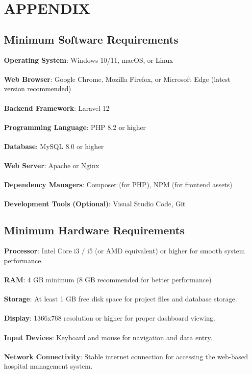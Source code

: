\chapter{APPENDIX}

\section{Minimum Software Requirements}

\medskip
\textbf{Operating System}: Windows 10/11, macOS, or Linux
\\\\
\textbf{Web Browser}: Google Chrome, Mozilla Firefox, or Microsoft Edge (latest version recommended)
\\\\
\textbf{Backend Framework}: Laravel 12
\\\\
\textbf{Programming Language}: PHP 8.2 or higher
\\\\
\textbf{Database}: MySQL 8.0 or higher
\\\\
\textbf{Web Server}: Apache or Nginx
\\\\
\textbf{Dependency Managers}: Composer (for PHP), NPM (for frontend assets)
\\\\
\textbf{Development Tools (Optional)}: Visual Studio Code, Git

\section{Minimum Hardware Requirements}

\textbf{Processor}: Intel Core i3 / i5 (or AMD equivalent) or higher for smooth system performance.
\\\\
\textbf{RAM}: 4 GB minimum (8 GB recommended for better performance)
\\\\
\textbf{Storage}: At least 1 GB free disk space for project files and database storage.
\\\\
\textbf{Display}: 1366x768 resolution or higher for proper dashboard viewing.
\\\\
\textbf{Input Devices}: Keyboard and mouse for navigation and data entry.
\\\\
\textbf{Network Connectivity}: Stable internet connection for accessing the web-based hospital management system.
\\\\